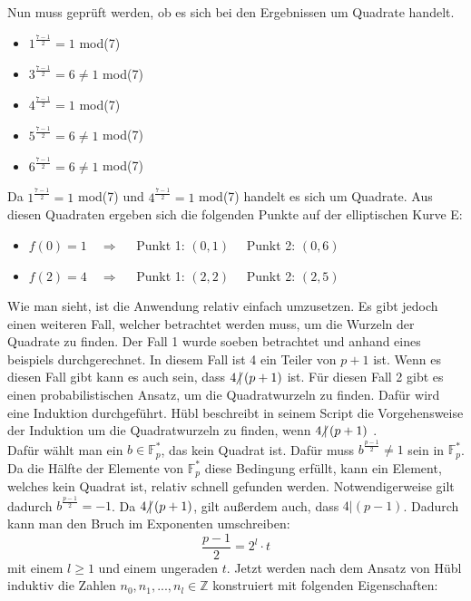 Nun muss geprüft werden, ob es sich bei den Ergebnissen um Quadrate handelt. 

\begin{itemize}
\item $1^{\frac{7 - 1}{2}} = 1$ mod(7)
\item $3^{\frac{7 - 1}{2}} = 6 \neq 1$ mod(7)
\item $4^{\frac{7 - 1}{2}} = 1$ mod(7)
\item $5^{\frac{7 - 1}{2}} = 6 \neq 1$ mod(7)
\item $6^{\frac{7 - 1}{2}} = 6 \neq 1$ mod(7)
\end{itemize} 

Da $1^{\frac{7 - 1}{2}} = 1$ mod(7) und $4^{\frac{7 - 1}{2}} = 1$ mod(7) handelt es sich um Quadrate. Aus diesen Quadraten ergeben sich die folgenden Punkte auf der elliptischen Kurve E:

\begin{itemize}
\item $f(0) = 1 \quad \Longrightarrow \quad$ Punkt 1: $(0, 1) \quad$ Punkt 2: $(0, 6)$
\item $f(2) = 4 \quad \Longrightarrow \quad$ Punkt 1: $(2, 2) \quad$ Punkt 2: $(2, 5)$
\end{itemize}

Wie man sieht, ist die Anwendung relativ einfach umzusetzen. Es gibt jedoch einen weiteren Fall, welcher betrachtet werden muss, um die Wurzeln der Quadrate zu finden. Der Fall 1 wurde soeben betrachtet und anhand eines beispiels durchgerechnet. In diesem Fall ist 4 ein Teiler von $p + 1$ ist. Wenn es diesen Fall gibt kann es auch sein, dass $4 \hspace{-0.4em}\not\hspace{0.025em}|\, (p + 1)$ ist. Für diesen Fall 2 gibt es einen probabilistischen Ansatz, um die Quadratwurzeln zu finden. Dafür wird eine Induktion durchgeführt. Hübl beschreibt in seinem Script die Vorgehensweise der Induktion um die Quadratwurzeln zu finden, wenn $4 \hspace{-0.4em}\not\hspace{0.025em}|\, (p + 1)$ \cite[S. 270-272]{Dr.ReinholdHubl.2022}.\\

Dafür wählt man ein $b \in \mathbb{F}_p^*$, das kein Quadrat ist. Dafür muss $b^{\frac{p - 1}{2}} \neq 1$ sein in $\mathbb{F}_p^*$. Da die Hälfte der Elemente von $\mathbb{F}_p^*$ diese Bedingung erfüllt, kann ein Element, welches kein Quadrat ist, relativ schnell gefunden werden. Notwendigerweise gilt dadurch $b^{\frac{p - 1}{2}} = - 1$. Da $4 \hspace{-0.4em}\not\hspace{0.025em}|\, (p + 1)$, gilt außerdem auch, dass $4 | (p - 1)$. Dadurch kann man den Bruch im Exponenten umschreiben: $$\frac{p - 1}{2} = 2^l \cdot t$$ mit einem $l \geq 1$ und einem ungeraden $t$. Jetzt werden nach dem Ansatz von Hübl induktiv die Zahlen $n_0, n_1, ..., n_l \in \mathbb{Z}$ konstruiert mit folgenden Eigenschaften:

